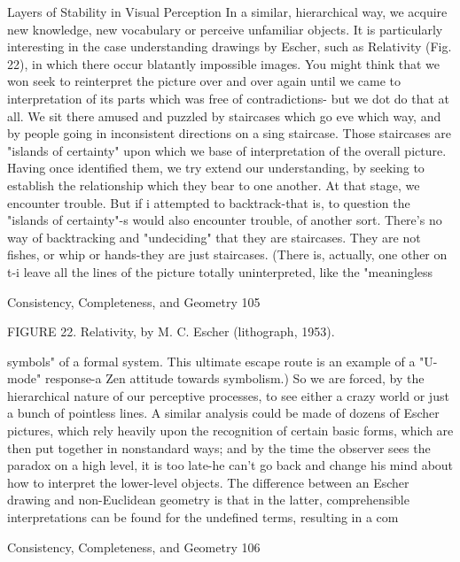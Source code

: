                     Layers of Stability in Visual Perception
        In a similar, hierarchical way, we acquire new knowledge, new vocabulary or
perceive unfamiliar objects. It is particularly interesting in the case understanding
drawings by Escher, such as Relativity (Fig. 22), in which there occur blatantly
impossible images. You might think that we won seek to reinterpret the picture over and
over again until we came to interpretation of its parts which was free of contradictions-
but we dot do that at all. We sit there amused and puzzled by staircases which go eve
which way, and by people going in inconsistent directions on a sing staircase. Those
staircases are "islands of certainty" upon which we base of interpretation of the overall
picture. Having once identified them, we try extend our understanding, by seeking to
establish the relationship which they bear to one another. At that stage, we encounter
trouble. But if i attempted to backtrack-that is, to question the "islands of certainty"-s
would also encounter trouble, of another sort. There's no way of backtracking and
"undeciding" that they are staircases. They are not fishes, or whip or hands-they are just
staircases. (There is, actually, one other on t-i leave all the lines of the picture totally
uninterpreted, like the "meaningless




Consistency, Completeness, and Geometry                                                 105

                  FIGURE 22. Relativity, by M. C. Escher (lithograph, 1953).

symbols" of a formal system. This ultimate escape route is an example of a "U-mode"
response-a Zen attitude towards symbolism.)
        So we are forced, by the hierarchical nature of our perceptive processes, to see
either a crazy world or just a bunch of pointless lines. A similar analysis could be made
of dozens of Escher pictures, which rely heavily upon the recognition of certain basic
forms, which are then put together in nonstandard ways; and by the time the observer
sees the paradox on a high level, it is too late-he can't go back and change his mind about
how to interpret the lower-level objects. The difference between an Escher drawing and
non-Euclidean geometry is that in the latter, comprehensible interpretations can be found
for the undefined terms, resulting in a com




Consistency, Completeness, and Geometry                                                106

